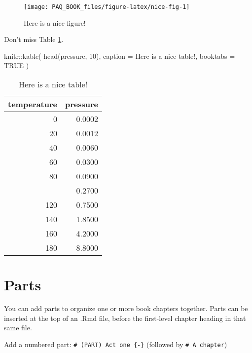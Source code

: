 \documentclass[
]{book}
\newenvironment{Shaded}{\begin{snugshade}}{\end{snugshade}}
\newcommand{\AttributeTok}[1]{\textcolor[rgb]{0.77,0.63,0.00}{#1}}
\newcommand{\ConstantTok}[1]{\textcolor[rgb]{0.00,0.00,0.00}{#1}}
\newcommand{\DecValTok}[1]{\textcolor[rgb]{0.00,0.00,0.81}{#1}}
\newcommand{\FunctionTok}[1]{\textcolor[rgb]{0.00,0.00,0.00}{#1}}
\newcommand{\NormalTok}[1]{#1}
\newcommand{\SpecialCharTok}[1]{\textcolor[rgb]{0.00,0.00,0.00}{#1}}
\newcommand{\StringTok}[1]{\textcolor[rgb]{0.31,0.60,0.02}{#1}}
\theoremstyle{definition}
\theoremstyle{definition}
\theoremstyle{definition}
\theoremstyle{definition}
\theoremstyle{remark}
\begin{document}
\begin{figure}

{\centering \texttt{[image: PAQ\_BOOK\_files/figure-latex/nice-fig-1]} 

}

\caption{Here is a nice figure!}\label{fig:nice-fig}
\end{figure}

Don't miss Table \ref{tab:nice-tab}.

\begin{Shaded}
\begin{Highlighting}[]
\NormalTok{knitr}\SpecialCharTok{::}\FunctionTok{kable}\NormalTok{(}
  \FunctionTok{head}\NormalTok{(pressure, }\DecValTok{10}\NormalTok{), }\AttributeTok{caption =} \StringTok{\textquotesingle{}Here is a nice table!\textquotesingle{}}\NormalTok{,}
  \AttributeTok{booktabs =} \ConstantTok{TRUE}
\NormalTok{)}
\end{Highlighting}
\end{Shaded}

\begin{table}

\caption{\label{tab:nice-tab}Here is a nice table!}
\centering
\begin{tabular}[t]{rr}
\toprule
temperature & pressure\\
\midrule
0 & 0.0002\\
20 & 0.0012\\
40 & 0.0060\\
60 & 0.0300\\
80 & 0.0900\\
\addlinespace
100 & 0.2700\\
120 & 0.7500\\
140 & 1.8500\\
160 & 4.2000\\
180 & 8.8000\\
\bottomrule
\end{tabular}
\end{table}

\hypertarget{parts}{%
\chapter{Parts}\label{parts}}

You can add parts to organize one or more book chapters together. Parts can be inserted at the top of an .Rmd file, before the first-level chapter heading in that same file.

Add a numbered part: \texttt{\#\ (PART)\ Act\ one\ \{-\}} (followed by \texttt{\#\ A\ chapter})
\end{document}
